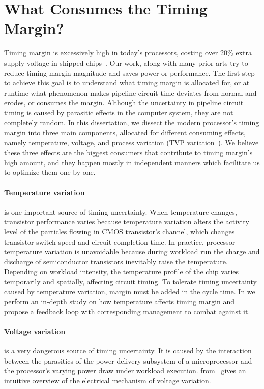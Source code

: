 \section{What Consumes the Timing Margin?}
\label{sec:background:components}

Timing margin is excessively high in today's processors, costing over 20\% extra supply voltage in shipped chips~\cite{reddi2010voltage, leng2015gpu}. Our work, along with many prior arts try to reduce timing margin magnitude and saves power or performance. The first step to achieve this goal is to understand what timing margin is allocated for, or at runtime what phenomenon makes pipeline circuit time deviates from normal and erodes, or consumes the margin. Although the uncertainty in pipeline circuit timing is caused by parasitic effects in the computer system, they are not completely random. In this dissertation, we dissect the modern processor's timing margin into three main components, allocated for different consuming effects, namely temperature, voltage, and process variation (TVP variation~\cite{reddi2013resilient}). We believe these three effects are the biggest consumers that contribute to timing margin's high amount, and they happen mostly in independent manners which facilitate us to optimize them one by one.

\paragraph{Temperature variation} is one important source of timing uncertainty. When temperature changes, transistor performance varies because temperature variation alters the activity level of the particles flowing in CMOS transistor's channel, which changes transistor switch speed and circuit completion time. In practice, processor temperature variation is unavoidable because during workload run the charge and discharge of semiconductor transistors inevitably raise the temperature. Depending on workload intensity, the temperature profile of the chip varies temporarily and spatially, affecting circuit timing. To tolerate timing uncertainty caused by temperature variation, margin must be added in the cycle time. In  we perform an in-depth study on how temperature affects timing margin and propose a feedback loop with corresponding management to combat against it.

\paragraph{Voltage variation} is a very dangerous source of timing uncertainty. It is caused by the interaction between the parasitics of the power delivery subsystem of a microprocessor and the processor's varying power draw under workload execution.  from~\cite{leng2014gpuvolt} gives an intuitive overview of the electrical mechanism of voltage variation.

